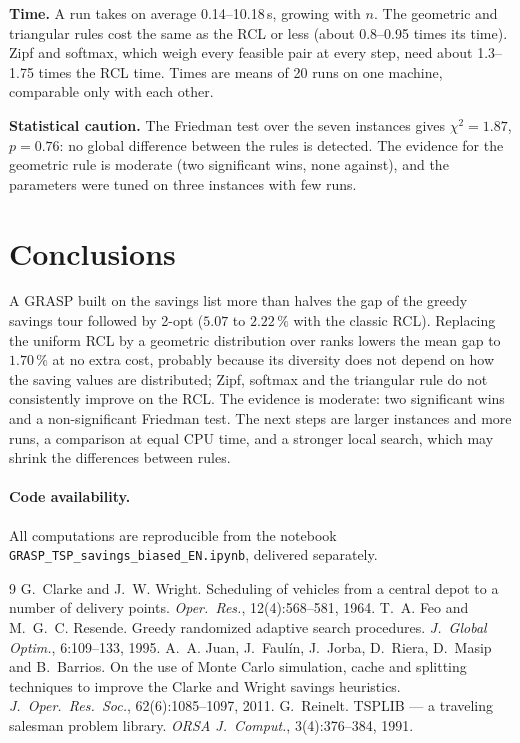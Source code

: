 \documentclass[10pt,a4paper]{article}
\begin{document}
\textbf{Time.} A run takes on average 0.14--10.18\,s, growing with $n$. The geometric and triangular rules cost the same as the RCL or less (about 0.8--0.95 times its time). Zipf and softmax, which weigh every feasible pair at every step, need about 1.3--1.75 times the RCL time. Times are means of 20 runs on one machine, comparable only with each other.

\textbf{Statistical caution.} The Friedman test over the seven instances gives $\chi^2=1.87$,
$p=0.76$: no global difference between the rules is detected. The evidence for the
geometric rule is moderate (two significant wins, none against), and the parameters were tuned on three instances with few runs.

\section{Conclusions}

A GRASP built on the savings list more than halves the gap of the greedy savings tour followed by 2-opt ($5.07$ to $2.22\,\%$ with the classic RCL). Replacing the uniform
RCL by a geometric distribution over ranks lowers the mean gap to $1.70\,\%$ at no extra cost, probably because
its diversity does not depend on how the saving values are distributed; Zipf, softmax and the triangular rule do not
consistently improve on the RCL. The evidence is moderate: two significant wins and a non-significant Friedman test. The next steps are larger instances and more runs, a comparison at equal CPU
time, and a stronger local search, which may shrink the differences between rules.

\paragraph{Code availability.} All computations are reproducible from the notebook
\texttt{GRASP\_TSP\_savings\_biased\_EN.ipynb}, delivered separately.

\begin{thebibliography}{9}
\footnotesize\setlength{\itemsep}{0pt}\setlength{\parskip}{0pt}
 G.~Clarke and J.~W. Wright. Scheduling of vehicles from a central depot to a number of
delivery points. \emph{Oper.\ Res.}, 12(4):568--581, 1964.
 T.~A. Feo and M.~G.~C. Resende. Greedy randomized adaptive search procedures.
\emph{J.\ Global Optim.}, 6:109--133, 1995.
 A.~A. Juan, J.~Faulín, J.~Jorba, D.~Riera, D.~Masip and B.~Barrios. On the use of Monte
Carlo simulation, cache and splitting techniques to improve the Clarke and Wright savings heuristics.
\emph{J.\ Oper.\ Res.\ Soc.}, 62(6):1085--1097, 2011.
 G.~Reinelt. TSPLIB --- a traveling salesman problem library. \emph{ORSA J.\ Comput.},
3(4):376--384, 1991.
\end{thebibliography}
\end{document}
